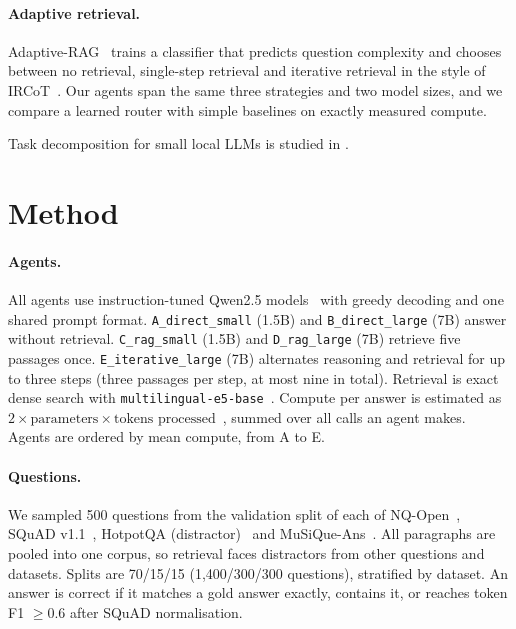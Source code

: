 \documentclass[11pt,a4paper]{article}
\newcommand{\code}[1]{\texttt{#1}}
\begin{document}
\paragraph{Adaptive retrieval.} Adaptive-RAG~\cite{jeong2024adaptiverag} trains a classifier that predicts question
complexity and chooses between no retrieval, single-step retrieval and iterative retrieval in the style of
IRCoT~\cite{trivedi2023ircot}. Our agents span the same three strategies and two model sizes, and we compare a
learned router with simple baselines on exactly measured compute.

Task decomposition for small local LLMs is studied in \cite{hussain2026splitting}.

\section{Method}

\paragraph{Agents.} All agents use instruction-tuned Qwen2.5 models~\cite{qwen2025qwen25} with greedy decoding and one
shared prompt format. \code{A\_direct\_small} (1.5B) and \code{B\_direct\_large} (7B) answer without retrieval.
\code{C\_rag\_small} (1.5B) and \code{D\_rag\_large} (7B) retrieve five passages once. \code{E\_iterative\_large}
(7B) alternates reasoning and retrieval for up to three steps (three passages per step, at most nine in total).
Retrieval is exact dense search with \code{multilingual-e5-base}~\cite{wang2024me5}. Compute per answer is estimated
as $2 \times \text{parameters} \times \text{tokens processed}$~\cite{kaplan2020scaling}, summed over all calls an
agent makes. Agents are ordered by mean compute, from A to E.

\paragraph{Questions.} We sampled 500 questions from the validation split of each of NQ-Open~\cite{lee2019latent,
kwiatkowski2019nq}, SQuAD v1.1~\cite{rajpurkar2016squad}, HotpotQA (distractor)~\cite{yang2018hotpotqa} and
MuSiQue-Ans~\cite{trivedi2022musique}. All paragraphs are pooled into one corpus, so retrieval faces distractors from
other questions and datasets. Splits are 70/15/15 (1,400/300/300 questions), stratified by dataset. An answer is
correct if it matches a gold answer exactly, contains it, or reaches token F1 $\ge 0.6$ after SQuAD normalisation.
\end{document}
